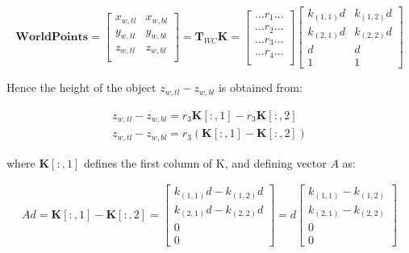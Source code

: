 \documentclass[11pt,twoside]{report}
\begin{document}
\begin{equation}
\mathbf{WorldPoints} = 
\begin{bmatrix}
x_{w,tl} &  x_{w,bl}\\
y_{w,tl} & y_{w,bl}\\
z_{w,tl} & z_{w,bl} \\
\end{bmatrix} = 
\mathbf{T}_{WC}\mathbf{K} =
\begin{bmatrix}
\dots r_{1} \dots \\
\dots r_{2} \dots \\
\dots r_{3} \dots \\
\dots r_{4} \dots \\
\end{bmatrix}
\begin{bmatrix}
k_{(1,1)}\mathit{d} & k_{(1,2)}\mathit{d}\\
k_{(2,1)}\mathit{d} & k_{(2,2)}\mathit{d}\\
\mathit{d} & \mathit{d}\\
1 & 1
\end{bmatrix} 
\label{check__depth_eq3}
\end{equation}

Hence the height of the object $z_{w,tl}-z_{w,bl}$ is obtained from:

\begin{equation}
\begin{aligned}
z_{w,tl}-z_{w,bl} = r_{3} \mathbf{K}[:,1] - r_{3} \mathbf{K}[:,2]\\
z_{w,tl}-z_{w,bl} = r_{3} (\mathbf{K}[:,1]- \mathbf{K}[:,2])
\end{aligned}
\end{equation}

where $\mathbf{K}[:,1]$ defines the first column of K, and defining vector $A$ as:

\begin{equation}
\begin{aligned}
A\mathit{d} = \mathbf{K}[:,1]- \mathbf{K}[:,2] = 
\begin{bmatrix}
k_{(1,1)}\mathit{d} - k_{(1,2)}\mathit{d}\\
k_{(2,1)}\mathit{d} - k_{(2,2)}\mathit{d}\\
0\\
0
\end{bmatrix}
= 
\mathit{d}
\begin{bmatrix}
k_{(1,1)} - k_{(1,2)}\\
k_{(2,1)} - k_{(2,2)}\\
0\\
0
\end{bmatrix}
\end{aligned}
\end{equation}
\end{document}
